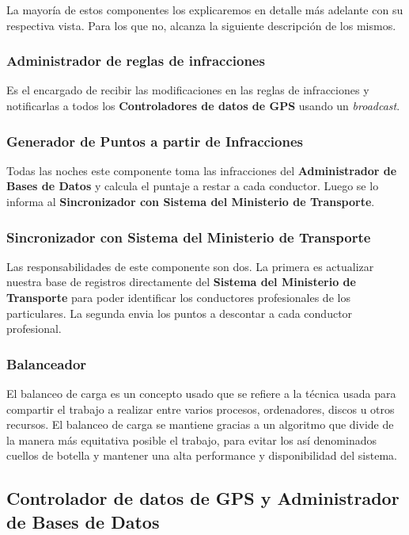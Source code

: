 La mayoría de estos componentes los explicaremos en detalle más adelante con su 
respectiva vista. Para los que no, alcanza la siguiente descripción de los 
mismos.


\subsubsection{Administrador de reglas de infracciones}

Es el encargado de recibir las modificaciones en las reglas de infracciones y 
notificarlas a todos los \textbf{Controladores de datos de GPS} usando un \textit{broadcast}.

\subsubsection{Generador de Puntos a partir de Infracciones}

Todas las noches este componente toma las infracciones del \textbf{Administrador de Bases de Datos} 
y calcula el puntaje a restar a cada conductor. Luego se lo informa al
\textbf{Sincronizador con Sistema del Ministerio de Transporte}.

\subsubsection{Sincronizador con Sistema del Ministerio de Transporte}

Las responsabilidades de este componente son dos.
La primera es actualizar nuestra base de registros directamente del \textbf{Sistema del Ministerio de Transporte}
para poder identificar los conductores profesionales de los particulares. 
La segunda envia los puntos a descontar a cada conductor profesional.

\subsubsection{Balanceador}
El balanceo de carga es un concepto usado que se refiere a la técnica usada para compartir el trabajo
a realizar entre varios procesos, ordenadores, discos u otros recursos.
El balanceo de carga se mantiene gracias a un algoritmo que divide de la manera más equitativa posible
el trabajo, para evitar los así denominados cuellos de botella y mantener una 
alta performance y disponibilidad del sistema.


\subsection{Controlador de datos de GPS y Administrador de Bases de Datos}

